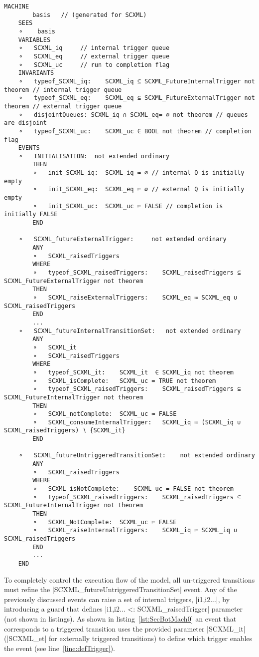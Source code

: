 \begin{lstlisting}[caption={Snippet of abstract basis machine}, label={lst:BasisMachine},language=Event-B, escapechar=|, frame=single]
MACHINE
		basis 	// (generated for SCXML)
	SEES
	⚬	 basis 
	VARIABLES
	⚬	SCXML_iq	 // internal trigger queue
	⚬	SCXML_eq	 // external trigger queue
	⚬	SCXML_uc	 // run to completion flag
	INVARIANTS
	⚬	typeof_SCXML_iq:	SCXML_iq ⊆ SCXML_FutureInternalTrigger not theorem // internal trigger queue
	⚬	typeof_SCXML_eq:	SCXML_eq ⊆ SCXML_FutureExternalTrigger not theorem // external trigger queue
	⚬	disjointQueues:	SCXML_iq ∩ SCXML_eq= ∅ not theorem // queues are disjoint
	⚬	typeof_SCXML_uc:	SCXML_uc ∈ BOOL not theorem // completion flag
	EVENTS
	⚬	INITIALISATION:	 not extended ordinary 
		THEN
		⚬	init_SCXML_iq:	SCXML_iq ≔ ∅ // internal Q is initially empty
		⚬	init_SCXML_eq:	SCXML_eq ≔ ∅ // external Q is initially empty
		⚬	init_SCXML_uc:	SCXML_uc ≔ FALSE // completion is initially FALSE
		END

	⚬	SCXML_futureExternalTrigger:	 not extended ordinary 
		ANY
		⚬	SCXML_raisedTriggers	 
		WHERE
		⚬	typeof_SCXML_raisedTriggers:	SCXML_raisedTriggers ⊆ SCXML_FutureExternalTrigger not theorem 
		THEN
		⚬	SCXML_raiseExternalTriggers:	SCXML_eq ≔ SCXML_eq ∪ SCXML_raisedTriggers 
		END
        ...
	⚬	SCXML_futureInternalTransitionSet:	 not extended ordinary 
		ANY
		⚬	SCXML_it	 
		⚬	SCXML_raisedTriggers	 
		WHERE
		⚬	typeof_SCXML_it:	SCXML_it  ∈ SCXML_iq not theorem 
		⚬	SCXML_isComplete:	SCXML_uc = TRUE not theorem 
		⚬	typeof_SCXML_raisedTriggers:	SCXML_raisedTriggers ⊆ SCXML_FutureInternalTrigger not theorem 
		THEN
		⚬	SCXML_notComplete:	SCXML_uc ≔ FALSE 
		⚬	SCXML_consumeInternalTrigger:	SCXML_iq ≔ (SCXML_iq ∪ SCXML_raisedTriggers) ∖ {SCXML_it} 
		END

	⚬	SCXML_futureUntriggeredTransitionSet:	 not extended ordinary 
		ANY
		⚬	SCXML_raisedTriggers	 
		WHERE
		⚬	SCXML_isNotComplete:	SCXML_uc = FALSE not theorem 
		⚬	typeof_SCXML_raisedTriggers:	SCXML_raisedTriggers ⊆ SCXML_FutureInternalTrigger not theorem 
		THEN
		⚬	SCXML_NotComplete:	SCXML_uc ≔ FALSE 
		⚬	SCXML_raiseInternalTriggers:	SCXML_iq ≔ SCXML_iq ∪ SCXML_raisedTriggers 
		END
        ...
	END
\end{lstlisting}

To completely control the execution flow of the model, all un-triggered transitions must refine the |SCXML_futureUntriggeredTransitionSet| event. 
Any of the previously discussed events can raise a set of internal triggers, |{i1,i2...}|, by introducing a guard that defines |{i1,i2...} <: SCXML_raisedTrigger| parameter (not shown in listings). 
As shown in listing~\ref{lst:SecBotMach0} an event that corresponds to a triggered transition uses the provided parameter |SCXML_it| (|SCXML_et| for externally triggered transitions) to define which trigger enables the event (see line~\ref{line:defTrigger}).

